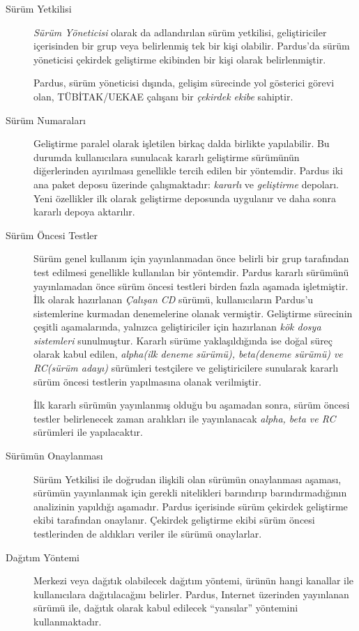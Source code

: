 \documentclass[a4]{article}
\begin{document}
\begin{description}
\item[Sürüm Yetkilisi] \emph{Sürüm Yöneticisi} olarak da adlandırılan
  sürüm yetkilisi, geliştiriciler içerisinden bir grup veya
  belirlenmiş tek bir kişi olabilir. Pardus'da sürüm yöneticisi
  çekirdek geliştirme ekibinden bir kişi olarak belirlenmiştir.

  Pardus, sürüm yöneticisi dışında, gelişim sürecinde yol gösterici
  görevi olan, TÜBİTAK/UEKAE çalışanı bir \emph{çekirdek ekibe}
  sahiptir.
\item[Sürüm Numaraları] Geliştirme paralel olarak işletilen birkaç
  dalda birlikte yapılabilir. Bu durumda kullanıcılara sunulacak
  kararlı geliştirme sürümünün diğerlerinden ayırılması genellikle
  tercih edilen bir yöntemdir. Pardus iki ana paket deposu üzerinde
  çalışmaktadır: \emph{kararlı} ve \emph{geliştirme} depoları. Yeni
  özellikler ilk olarak geliştirme deposunda uygulanır ve daha sonra
  kararlı depoya aktarılır.
\item[Sürüm Öncesi Testler] Sürüm genel kullanım için yayınlanmadan
  önce belirli bir grup tarafından test edilmesi genellikle kullanılan
  bir yöntemdir. Pardus kararlı sürümünü yayınlamadan önce sürüm
  öncesi testleri birden fazla aşamada işletmiştir. İlk olarak
  hazırlanan \emph{Çalışan CD} sürümü, kullanıcıların Pardus'u
  sistemlerine kurmadan denemelerine olanak vermiştir. Geliştirme
  sürecinin çeşitli aşamalarında, yalnızca geliştiriciler için
  hazırlanan \emph{kök dosya sistemleri} sunulmuştur. Kararlı sürüme
  yaklaşıldığında ise doğal süreç olarak kabul edilen,
  \emph{alpha(ilk deneme sürümü), beta(deneme sürümü) ve RC(sürüm
    adayı)} sürümleri testçilere ve geliştiricilere sunularak kararlı
  sürüm öncesi testlerin yapılmasına olanak verilmiştir.

  İlk kararlı sürümün yayınlanmış olduğu bu aşamadan sonra, sürüm
  öncesi testler belirlenecek zaman aralıkları ile yayınlanacak
  \emph{alpha, beta ve RC} sürümleri ile yapılacaktır.
\item[Sürümün Onaylanması] Sürüm Yetkilisi ile doğrudan ilişkili olan
  sürümün onaylanması aşaması, sürümün yayınlanmak için gerekli
  nitelikleri barındırıp barındırmadığının analizinin yapıldığı
  aşamadır. Pardus içerisinde sürüm çekirdek geliştirme ekibi
  tarafından onaylanır. Çekirdek geliştirme ekibi sürüm öncesi
  testlerinden de aldıkları veriler ile sürümü onaylarlar.
\item[Dağıtım Yöntemi] Merkezi veya dağıtık olabilecek dağıtım
  yöntemi, ürünün hangi kanallar ile kullanıcılara dağıtılacağını
  belirler. Pardus, Internet üzerinden yayınlanan sürümü ile, dağıtık
  olarak kabul edilecek ``yansılar'' yöntemini kullanmaktadır.
\end{description}
\end{document}
